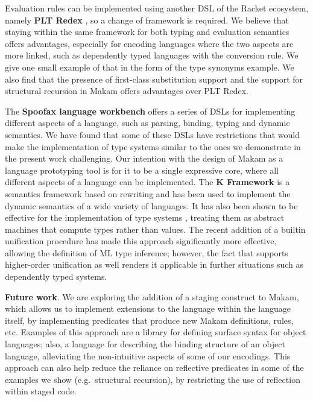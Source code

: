 Evaluation rules can be implemented using another DSL of the Racket
ecosystem, namely \textbf{PLT Redex} \citep{felleisen2009semantics}, so
a change of framework is required. We believe that staying within the
same framework for both typing and evaluation semantics offers
advantages, especially for encoding languages where the two aspects are
more linked, such as dependently typed languages with the conversion
rule. We give one small example of that in the form of the type synonyms
example. We also find that the presence of first-class substitution
support and the support for structural recursion in Makam offers
advantages over PLT Redex.

The \textbf{Spoofax language workbench} \citep{spoofax-main-reference}
offers a series of DSLs for implementing different aspects of a
language, such as parsing, binding, typing and dynamic semantics. We
have found that some of these DSLs have restrictions that would make the
implementation of type systems similar to the ones we demonstrate in the
present work challenging. Our intention with the design of Makam as a
language prototyping tool is for it to be a single expressive core,
where all different aspects of a language can be implemented. The
\textbf{K Framework} \citep{k-framework-main-reference} is a semantics
framework based on rewriting and has been used to implement the dynamic
semantics of a wide variety of languages. It has also been shown to be
effective for the implementation of type systems
\citep{k-framework-type-systems}, treating them as abstract machines
that compute types rather than values. The recent addition of a builtin
unification procedure has made this approach significantly more
effective, allowing the definition of ML type inference; however, the
fact that \lamprolog supports higher-order unification as well renders
it applicable in further situations such as dependently typed systems.

\textbf{Future work}. We are exploring the addition of a staging
construct to Makam, which allows us to implement extensions to the
language within the language itself, by implementing predicates that
produce new Makam definitions, rules, etc. Examples of this approach are
a library for defining surface syntax for object languages; also, a
language for describing the binding structure of an object language,
alleviating the non-intuitive aspects of some of our encodings. This
approach can also help reduce the reliance on reflective predicates in
some of the examples we show (e.g.~structural recursion), by restricting
the use of reflection within staged code.
